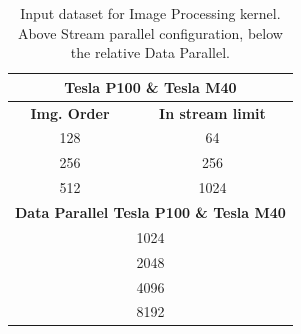 \begin{table}	
	\centering
	\begin{tabular}{| c | c |} 
		\hline
		
		 \multicolumn{2}{c}{\textbf{Tesla P100} \& \textbf{Tesla M40}} \\ [0.5ex]
		\hline
		
		\textbf{Img. Order} & \textbf{In stream limit} \\ 
		\hline\hline
		128 & 64 \\ 
		\hline		
		256	& 256 \\ 
		\hline			
		512	& 1024 \\ 
		
		\hline\hline	
		\multicolumn{2}{c}{\textbf{Data Parallel Tesla P100 \& Tesla M40}} \\ [0.5ex] 
		
		\hline\hline		
		\multicolumn{2}{c}{1024 } \\ [0.5ex] 
		
		\multicolumn{2}{c}{2048 } \\ [0.5ex] 
		
		\multicolumn{2}{c}{4096 } \\ [0.5ex] 
		
		\multicolumn{2}{c}{8192 } \\ [0.5ex] 
		\hline	
	\end{tabular}
	\caption{Input dataset for Image Processing kernel. Above Stream parallel configuration, below the relative Data Parallel.}	
	\label{tab:imgdata}		
\end{table}

